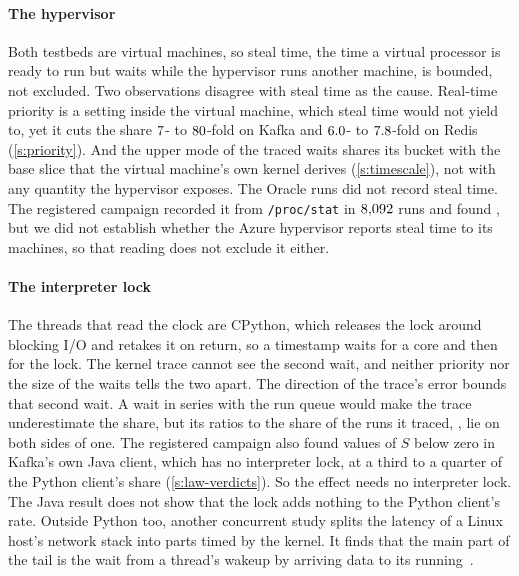 \documentclass[10pt,journal,onecolumn]{IEEEtran}
\newcommand{\kafka}{Kafka}
\newcommand{\redis}{Redis}
\begin{document}
\paragraph{The hypervisor} Both testbeds are virtual machines, so steal time, the time a virtual
processor is ready to run but waits while the hypervisor runs another machine, is bounded, not
excluded. Two observations disagree with steal time as the cause. Real-time priority is a setting
inside the virtual machine, which steal time would not yield to, yet it cuts the share
$7$- to $80$-fold on \kafka{} and $6.0$- to
$7.8$-fold on \redis{} (\ref{s:priority}). And the upper mode of the traced waits shares its
bucket with the base slice that the virtual machine's own kernel derives (\ref{s:timescale}), not with any
quantity the hypervisor exposes. The Oracle runs did not record steal time. The registered
campaign recorded it from \texttt{/proc/stat} in $8{,}092$ runs and found \stealFinding{},
but we did not establish whether the Azure hypervisor reports steal time to its machines, so that
reading does not exclude it either.

\paragraph{The interpreter lock} The threads that read the clock are CPython, which releases the
lock around blocking I/O and retakes it on return, so a timestamp waits for a core and then for
the lock. The kernel trace cannot see the second wait, and neither priority nor the size of the
waits tells the two apart. The direction of the trace's error bounds that second wait. A wait in
series with the run queue would make the trace underestimate the share, but its ratios to the share
of the runs it traced, \tracedPooledRatios{}, lie on both sides of one. The registered campaign
also found values of $S$ below zero in \kafka{}'s own Java client, which has no interpreter lock,
at a third to a quarter of the Python client's share (\ref{s:law-verdicts}). So the effect needs no
interpreter lock. The Java result does not show that the lock adds nothing to the Python client's
rate. Outside Python too, another concurrent study splits the latency of a Linux host's network
stack into parts timed by the kernel. It finds that the main part of the tail is the wait from a
thread's wakeup by arriving data to its running~\cite{zuo2026hoststack}.
\end{document}
